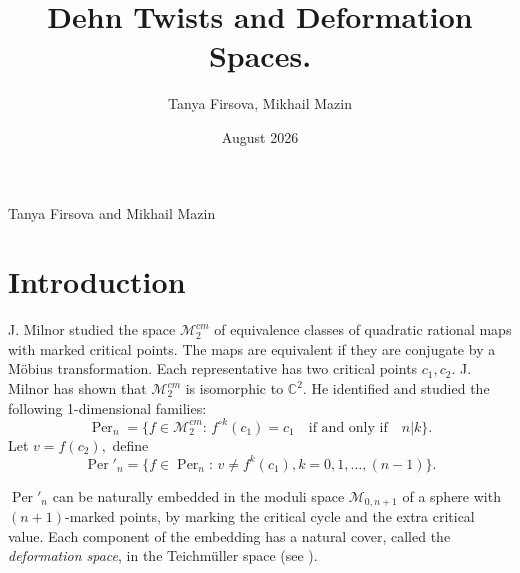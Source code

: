 \documentclass{article}
\title{Dehn Twists and Deformation Spaces.}
\author{Tanya Firsova, Mikhail Mazin}
\date{August 2026}
\begin{document}
\begin{center}
{\large Tanya Firsova and Mikhail Mazin}
\end{center}
\newcommand{\aaa}{\mathfrak{a}}
\newcommand{\cc}{\mathfrak{c}}
\newcommand{\bb}{\mathfrak{b}}
\newcommand{\C}{\mathbb{C}}
\newcommand{\CP}{\mathbb{CP}^1}
\newcommand{\Z}{\mathbb{Z}}
\newcommand{\W}{\mathcal{W}}
\newcommand{\U}{\mathcal{U}}
\newcommand{\V}{\mathcal{V}}
\newcommand{\D}{\mathcal{D}}
\newcommand{\X}{\mathcal{X}}
\newcommand{\Q}{\mathcal{Q}}
\newcommand{\M}{\mathcal{M}}
\newcommand{\Pf}{\mathcal{P}}
\newcommand{\Def}{\mathcal{D}}
\renewcommand{\S}{\mathbb{S}}
\newcommand{\e}{\varepsilon}
\newcommand{\s}{\mathfrak{s}}
\newcommand{\Per}{\operatorname{Per}}
\newcommand{\Mod}{\operatorname{Mod}}
\newcommand{\Mapp}{\operatorname{MCG}}
\newcommand{\Teich}{\operatorname{Teich}}


\newtheorem{theorem}{Theorem}[section]
\newtheorem{lemma}[theorem]{Lemma}
\newtheorem{proposition}[theorem]{Proposition}
\newtheorem{corollary}[theorem]{Corollary}
\newtheorem{conjecture}[theorem]{Conjecture}
\newtheorem{question}[theorem]{Question}

\theoremstyle{definition}
\newtheorem{definition}[theorem]{Definition}
\newtheorem{example}[theorem]{Example}
\newtheorem{construction}[theorem]{Construction}

\theoremstyle{remark}
\newtheorem{remark}[theorem]{Remark}


\section{Introduction}

J. Milnor \cite{Milnor} studied the space ${\mathcal M}_2^{cm}$ of equivalence classes of quadratic rational maps with marked critical points. The maps are equivalent if they are conjugate by a M\"obius transformation. Each representative has two critical points $c_1,c_2$. J. Milnor has shown that ${\mathcal M}_2^{cm}$ is isomorphic to $\C^2.$ He identified and studied the following 1-dimensional families:
$$\Per_n = \{ f\in\mathcal{M}^{cm}_2 :\, f^{\circ k}(c_1) = c_1 \quad \mbox{if and only if}\quad  n|k\}.$$
Let $v=f(c_2),$ define
$$
\Per'_n=\{f\in \Per_n: \, v\neq f^k(c_1), k=0,1,\dots,(n-1)\}.
$$ 

$\Per'_n$ can be naturally embedded in the moduli space $\M_{0,n+1}$ of a sphere with $(n+1)$-marked points, by marking the critical cycle and the extra critical value. Each component of the embedding has a natural cover, called the \textit{deformation space}, in the Teichm\"uller space (see \cite{HK,FKS}).
\end{document}

